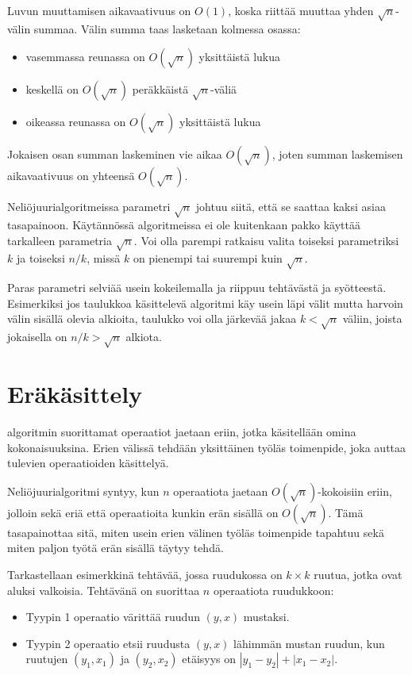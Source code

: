 Luvun muuttamisen aikavaativuus on
$O(1)$, koska riittää muuttaa yhden $\sqrt n$-välin summaa.
Välin summa taas lasketaan kolmessa osassa:

\begin{itemize}
\item vasemmassa reunassa on $O(\sqrt n)$ yksittäistä lukua
\item keskellä on $O(\sqrt n)$ peräkkäistä $\sqrt n$-väliä
\item oikeassa reunassa on $O(\sqrt n)$ yksittäistä lukua
\end{itemize}

Jokaisen osan summan laskeminen vie aikaa $O(\sqrt n)$,
joten summan laskemisen aikavaativuus on yhteensä $O(\sqrt n)$.

Neliöjuurialgoritmeissa parametri $\sqrt n$
johtuu siitä, että se saattaa kaksi asiaa tasapainoon.
Käytännössä algoritmeissa
ei ole kuitenkaan pakko käyttää
tarkalleen parametria $\sqrt n$.
Voi olla parempi ratkaisu valita toiseksi
parametriksi $k$ ja toiseksi $n/k$,
missä $k$ on pienempi tai suurempi kuin $\sqrt n$.

Paras parametri selviää usein kokeilemalla
ja riippuu tehtävästä ja syötteestä.
Esimerkiksi jos taulukkoa käsittelevä algoritmi
käy usein läpi välit mutta harvoin välin sisällä
olevia alkioita, taulukko voi olla järkevää
jakaa $k < \sqrt n$ väliin,
joista jokaisella on $n/k > \sqrt n$ alkiota.

\section{Eräkäsittely}


 algoritmin suorittamat
operaatiot jaetaan eriin,
jotka käsitellään omina kokonaisuuksina.
Erien välissä tehdään yksittäinen työläs toimenpide,
joka auttaa tulevien operaatioiden käsittelyä.

Neliöjuurialgoritmi syntyy, kun $n$ operaatiota
jaetaan $O(\sqrt n)$-kokoisiin eriin,
jolloin sekä eriä että operaatioita kunkin erän
sisällä on $O(\sqrt n)$.
Tämä tasapainottaa sitä, miten usein erien välinen
työläs toimenpide tapahtuu sekä miten paljon työtä
erän sisällä täytyy tehdä.

Tarkastellaan esimerkkinä tehtävää, jossa
ruudukossa on $k \times k$ ruutua,
jotka ovat aluksi valkoisia.
Tehtävänä on suorittaa $n$ operaatiota ruudukkoon:
\begin{itemize}
\item
Tyypin 1 operaatio värittää ruudun $(y,x)$ mustaksi.
\item
Tyypin 2 operaatio etsii ruudusta $(y,x)$ lähimmän
mustan ruudun, kun
ruutujen $(y_1,x_1)$ ja $(y_2,x_2)$
etäisyys on $|y_1-y_2|+|x_1-x_2|$.
\end{itemize}

